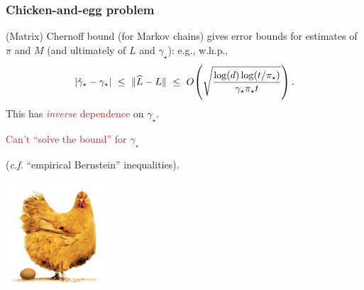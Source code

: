 \documentclass[11pt,compress,blue4,notheorem]{beamer}
\newcommand{\FIREBRICK}[1]{\textcolor{firebrick}{#1}}
\newcommand\fns\footnotesize
\newcommand\pimin{\ensuremath{\pi_{\star}}}
\newcommand\gap{\ensuremath{\gamma_{\star}}}
\newcommand\hatgap{\ensuremath{\hat{\gamma}_{\star}}}
\begin{document}

\begin{frame}
  \frametitle{Chicken-and-egg problem}

  (Matrix) Chernoff bound {\fns(for Markov chains)} gives error bounds
  for estimates of $\pi$ and $M$ (and ultimately of $L$ and $\gap$):
  e.g., w.h.p.,
  \[
    \abs{\hatgap-\gap}
    \ \leq \
    \norm{\wh L - L}
    \ \leq \
    O\Parens{
      \sqrt{\frac{\log(d)\log(t/\pimin)}{\gap\pimin t}}
    }
    \,.
  \]
  \onslide<2->
  This has \FIREBRICK{\emph{inverse} dependence} on $\gap$.

  \begin{center}
    \FIREBRICK{%
      Can't ``solve the bound'' for $\gap$
    }

    {\fns(\emph{c.f.} ``empirical Bernstein'' inequalities)}.

    \includegraphics[height=1.5in]{chicken-and-egg.jpg}
  \end{center}

\end{frame}

\end{document}

